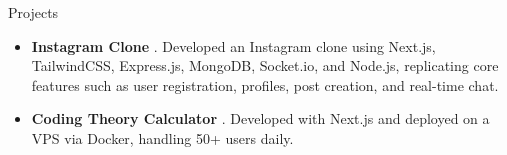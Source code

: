 \begin{cvsection}{Projects}
  \begin{cvsubsection}{}{}{}
    \begin{itemize}
      \item \textbf{Instagram Clone} \href{https://github.com/pl3lee/instagram-clone}{\faGithub}. Developed an Instagram clone using Next.js, TailwindCSS, Express.js, MongoDB, Socket.io, and Node.js, replicating core features such as user registration, profiles, post creation, and real-time chat.
      \item \textbf{Coding Theory Calculator} \href{https://github.com/pl3lee/coding-theory-calculator}{\faGithub}. Developed with Next.js and deployed on a VPS via Docker, handling 50+ users daily.
    \end{itemize}
  \end{cvsubsection}
\end{cvsection}